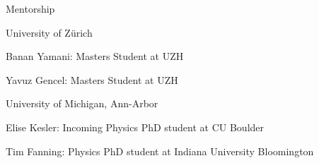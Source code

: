 \documentclass{resume} %
\begin{document}


\begin{rSection}{Mentorship}
\begin{rSubsection}{University of Zürich}{}{}{}
    \item Banan Yamani: Masters Student at UZH
    \item Yavuz Gencel: Masters Student at UZH
\end{rSubsection}

\begin{rSubsection}{University of Michigan, Ann-Arbor}{}{}{}
    \item Elise Kesler: Incoming Physics PhD student at CU Boulder
    \item Tim Fanning: Physics PhD student at Indiana University Bloomington
\end{rSubsection}

\end{rSection}





%

\end{document}

